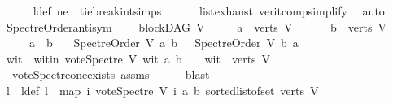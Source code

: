 \begin{isabellebody}
\ \ \ \ \isamarkupfalse%
\ l{\isacharunderscore}{\kern0pt}def\ ne\ \ tie{\isacharunderscore}{\kern0pt}break{\isacharunderscore}{\kern0pt}int{\isachardot}{\kern0pt}simps\isanewline
\ \ \ \ \ \ list{\isachardot}{\kern0pt}exhaust\ verit{\isacharunderscore}{\kern0pt}comp{\isacharunderscore}{\kern0pt}simplify{}{\isacharparenleft}{\kern0pt}{}{\isacharparenright}{\kern0pt}\ \isamarkupfalse%
\ auto\isanewline
{}\isamarkupfalse%
%
\endisatagproof
{\isafoldproof}%
%
\isadelimproof
\isanewline
%
\endisadelimproof
\isanewline
\isanewline
{}\isamarkupfalse%
\ Spectre{\isacharunderscore}{\kern0pt}Order{\isacharunderscore}{\kern0pt}antisym{\isacharcolon}{\kern0pt}\ \isanewline
\ \ \ {\isachardoublequoteopen}blockDAG\ V{\isachardoublequoteclose}\isanewline
\ \ \ \ \ {\isachardoublequoteopen}a\ {\isasymin}\ verts\ V{\isachardoublequoteclose}\ \isanewline
\ \ \ \ \ {\isachardoublequoteopen}b\ {\isasymin}\ verts\ V{\isachardoublequoteclose}\ \isanewline
\ \ \ \ \ {\isachardoublequoteopen}a\ {\isasymnoteq}\ b{\isachardoublequoteclose}\isanewline
\ \ \ {\isachardoublequoteopen}Spectre{\isacharunderscore}{\kern0pt}Order\ V\ a\ b\ {\isacharequal}{\kern0pt}\ {\isacharparenleft}{\kern0pt}{\isasymnot}\ {\isacharparenleft}{\kern0pt}Spectre{\isacharunderscore}{\kern0pt}Order\ V\ b\ a{\isacharparenright}{\kern0pt}{\isacharparenright}{\kern0pt}{\isachardoublequoteclose}\isanewline
%
\isadelimproof
%
\endisadelimproof
%
\isatagproof
{}\isamarkupfalse%
\ {\isacharminus}{\kern0pt}\isanewline
\ \ \isamarkupfalse%
\ wit\ \ wit{\isacharunderscore}{\kern0pt}in{\isacharcolon}{\kern0pt}\ {\isachardoublequoteopen}vote{\isacharunderscore}{\kern0pt}Spectre\ V\ wit\ a\ b\ {\isasymnoteq}\ {}\ {\isasymand}\ wit\ {\isasymin}\ verts\ V{\isachardoublequoteclose}\ \isanewline
\ \ \ \ \isamarkupfalse%
\ \ vote{\isacharunderscore}{\kern0pt}Spectre{\isacharunderscore}{\kern0pt}one{\isacharunderscore}{\kern0pt}exists\ assms\isanewline
\ \ \ \ \isamarkupfalse%
\ blast\ \isanewline
\ \ \isamarkupfalse%
\ l\ \ l{\isacharunderscore}{\kern0pt}def{\isacharcolon}{\kern0pt}\ {\isachardoublequoteopen}l\ {\isacharequal}{\kern0pt}\ {\isacharparenleft}{\kern0pt}map\ {\isacharparenleft}{\kern0pt}{\isasymlambda}i{\isachardot}{\kern0pt}\ vote{\isacharunderscore}{\kern0pt}Spectre\ V\ i\ a\ b{\isacharparenright}{\kern0pt}\ {\isacharparenleft}{\kern0pt}sorted{\isacharunderscore}{\kern0pt}list{\isacharunderscore}{\kern0pt}of{\isacharunderscore}{\kern0pt}set\ {\isacharparenleft}{\kern0pt}verts\ V{\isacharparenright}{\kern0pt}{\isacharparenright}{\kern0pt}{\isacharparenright}{\kern0pt}{\isachardoublequoteclose}\isanewline

\end{isabellebody}
